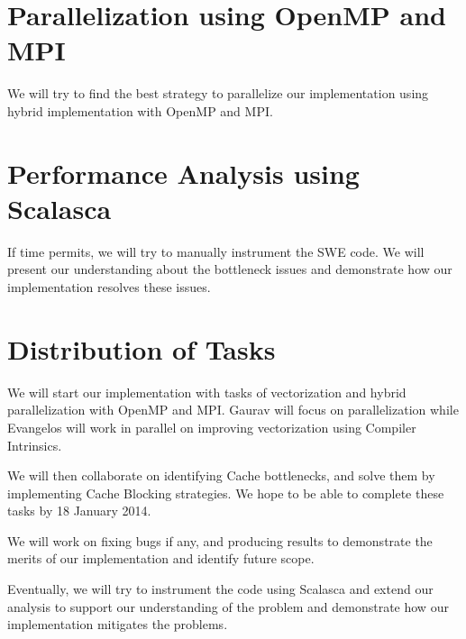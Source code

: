 \documentclass[]{article}
\begin{document}
\section{Parallelization using OpenMP and MPI}
We will try to find the best strategy to parallelize our implementation using hybrid
implementation with OpenMP and MPI. 

\section{Performance Analysis using Scalasca}
If time permits, we will try to manually instrument the SWE code. We will present our
understanding about the bottleneck issues and demonstrate how our implementation
resolves these issues.

\section{Distribution of Tasks}
We will start our implementation with tasks of vectorization and hybrid parallelization
with OpenMP and MPI. Gaurav will focus on parallelization while Evangelos will work in parallel
on improving vectorization using Compiler Intrinsics. 

We will then collaborate on identifying Cache bottlenecks, and solve them by implementing
Cache Blocking strategies. We hope to be able to complete these tasks by 18 January 2014.

We will work on fixing bugs if any, and producing results to demonstrate the merits of our
implementation and identify future scope.

Eventually, we will try to instrument the code using Scalasca and extend our analysis to support
our understanding of the problem and demonstrate how our implementation mitigates the problems.
\end{document}
